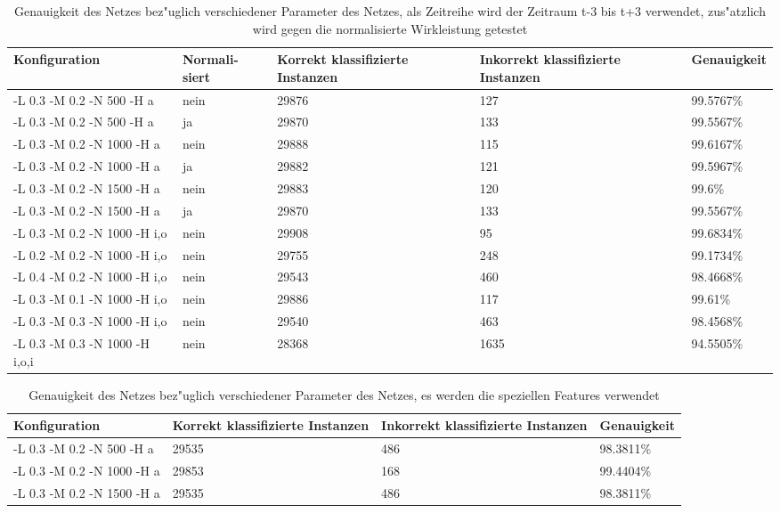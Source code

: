 \begin{table}[p]
\begin{tabular}{l|p{1.5cm}|p{3cm}|p{3cm}|l}
Konfiguration & Normali-siert & Korrekt klassifizierte Instanzen & Inkorrekt klassifizierte Instanzen & Genauigkeit  \\
\hline
-L 0.3 -M 0.2 -N 500 -H a & nein & 29876 & 127 & 99.5767\% \\
-L 0.3 -M 0.2 -N 500 -H a & ja & 29870 & 133 & 99.5567\% \\
-L 0.3 -M 0.2 -N 1000 -H a & nein & 29888 & 115 & 99.6167\% \\
-L 0.3 -M 0.2 -N 1000 -H a & ja & 29882 & 121 & 99.5967\% \\
-L 0.3 -M 0.2 -N 1500 -H a & nein & 29883 & 120 & 99.6\% \\
-L 0.3 -M 0.2 -N 1500 -H a & ja & 29870 & 133 & 99.5567\% \\
\hline
-L 0.3 -M 0.2 -N 1000 -H i,o & nein & 29908 & 95 & 99.6834\% \\
-L 0.2 -M 0.2 -N 1000 -H i,o & nein & 29755 & 248 & 99.1734\% \\
-L 0.4 -M 0.2 -N 1000 -H i,o & nein & 29543 & 460 & 98.4668\% \\
-L 0.3 -M 0.1 -N 1000 -H i,o & nein & 29886 & 117 & 99.61\% \\
-L 0.3 -M 0.3 -N 1000 -H i,o & nein & 29540 & 463 & 98.4568\% \\
-L 0.3 -M 0.3 -N 1000 -H i,o,i & nein & 28368 & 1635 & 94.5505\%
\end{tabular}
\caption[Parameterver"anderungen beste Zeitreihe]{Genauigkeit des Netzes bez"uglich verschiedener Parameter des Netzes, als Zeitreihe wird der Zeitraum t-3 bis t+3 verwendet, zus"atzlich wird gegen die normalisierte Wirkleistung getestet}
\label{EvalParam}
\end{table}



\begin{table}[p]
\begin{tabular}{l|p{3cm}|p{3cm}|l}
Konfiguration & Korrekt klassifizierte Instanzen & Inkorrekt klassifizierte Instanzen & Genauigkeit  \\
\hline
-L 0.3 -M 0.2 -N 500 -H a & 29535 & 486 & 98.3811\% \\
-L 0.3 -M 0.2 -N 1000 -H a & 29853 & 168 & 99.4404\% \\
-L 0.3 -M 0.2 -N 1500 -H a & 29535 & 486 & 98.3811\% \\
\end{tabular}
\caption[Spezielle Features]{Genauigkeit des Netzes bez"uglich verschiedener Parameter des Netzes, es werden die speziellen Features verwendet}
\label{EvalExp}
\end{table}

